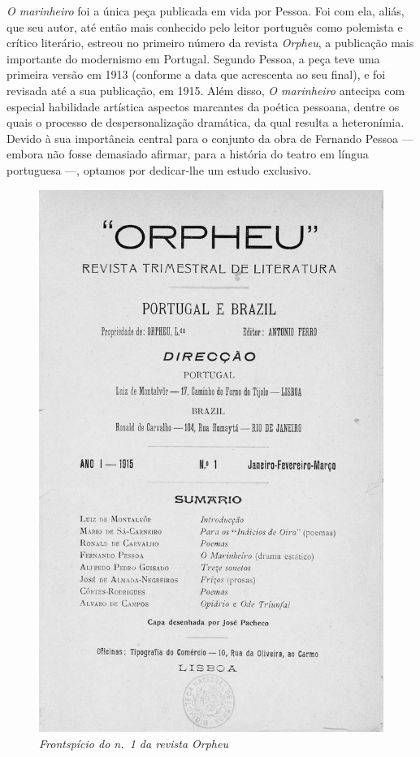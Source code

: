 \textit{O marinheiro} foi a única peça publicada em vida por Pessoa. Foi
com ela, aliás, que seu autor, até então mais conhecido pelo leitor
português como polemista e crítico literário, estreou no primeiro
número da revista \textit{Orpheu}, a publicação mais importante do
modernismo em Portugal. Segundo Pessoa, a peça teve uma primeira versão em 1913
(conforme a data que acrescenta ao seu final), e foi revisada até a sua
publicação, em 1915. Além disso, \textit{O marinheiro} antecipa com
especial habilidade artística aspectos marcantes da poética pessoana,
dentre os quais o processo de despersonalização dramática, da qual
resulta a heteronímia. Devido à sua importância central para o conjunto
da obra de Fernando Pessoa --- embora não fosse demasiado afirmar, para a
história do teatro em língua portuguesa ---, optamos por dedicar-lhe um
estudo exclusivo. 
\renewcommand{\caption}[1]{{\small\textit{#1}}}
\begin{figure}
\includegraphics[width=\textwidth]{3.png}
\caption{Frontspício do n.~1 da revista \emph{Orpheu}}
\end{figure}

